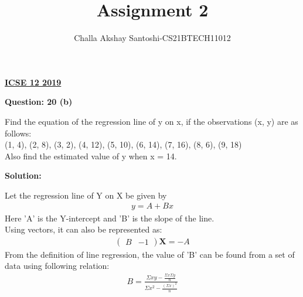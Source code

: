 \documentclass[journal,12pt,twocolumn]{IEEEtran}
\begin{document}
\newcommand{\myvec}[1]{\ensuremath{\begin{pmatrix}#1\end{pmatrix}}}
\newcommand{\mydet}[1]{\ensuremath{\begin{vmatrix}#1\end{vmatrix}}}
\makeatletter
{}
\makeatother
\let\StandardTheFigure\thefigure
\let\vec\mathbf
\renewcommand{\thefigure}{\theproblem}
\def\putbox#1#2#3{\makebox[0in][l]{\makebox[#1][l]{}\raisebox{\baselineskip}[0in][0in]{\raisebox{#2}[0in][0in]{#3}}}}
     \def\rightbox#1{\makebox[0in][r]{#1}}
     \def\centbox#1{\makebox[0in]{#1}}
     \def\topbox#1{\raisebox{-\baselineskip}[0in][0in]{#1}}
     \def\midbox#1{\raisebox{-0.5\baselineskip}[0in][0in]{#1}}
\vspace{3cm}
\title{Assignment 2}
\author{Challa Akshay Santoshi-CS21BTECH11012}
\maketitle
\newpage
\bigskip
\renewcommand{\thefigure}{\theenumi}
\renewcommand{\thetable}{\theenumi}
\begin{center}
  \textbf{\underline{ICSE 12 2019}}\\
\end{center}
\begin{center}
  \textbf{Question: 20 (b)}  
\end{center}
Find the equation of the regression line of y on x, if the observations (x, y) are as follows:\\
(1, 4), (2, 8), (3, 2), (4, 12), (5, 10), (6, 14), (7, 16), (8, 6), (9, 18)\\
Also find the estimated value of y when x = 14.\\
\begin{center}
  \textbf{Solution:}  
\end{center}
Let the regression line of Y on X be given by
\begin{align}
    y = A + Bx
\end{align}
Here 'A' is the Y-intercept and 'B' is the slope of the line.\\
Using vectors, it can also be represented as:
\begin{align}
    \myvec{B & -1}\vec{X} = -A
\end{align}
From the definition of line regression, the value of 'B' can be found from a set of data using following relation:\\
\begin{align}
    B = \frac{\Sigma xy - \frac{\Sigma x \Sigma y}{n}}{\Sigma x^2 - \frac{(\Sigma x)^2}{n}}
\end{align}
\end{document}
